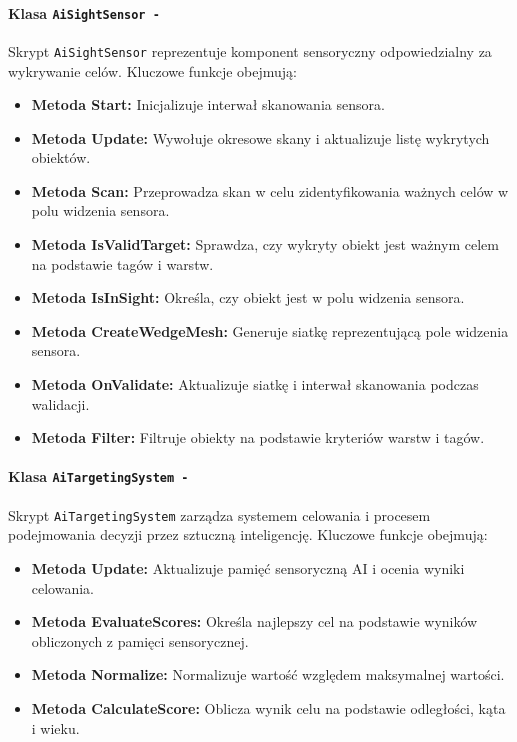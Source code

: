 \paragraph{Klasa \texttt{AiSightSensor -}}
Skrypt \texttt{AiSightSensor} reprezentuje komponent sensoryczny odpowiedzialny za wykrywanie celów. Kluczowe funkcje obejmują:
\begin{itemize}
  \item \textbf{Metoda Start:} Inicjalizuje interwał skanowania sensora.
  \item \textbf{Metoda Update:} Wywołuje okresowe skany i aktualizuje listę wykrytych obiektów.
  \item \textbf{Metoda Scan:} Przeprowadza skan w celu zidentyfikowania ważnych celów w polu widzenia sensora.
  \item \textbf{Metoda IsValidTarget:} Sprawdza, czy wykryty obiekt jest ważnym celem na podstawie tagów i warstw.
  \item \textbf{Metoda IsInSight:} Określa, czy obiekt jest w polu widzenia sensora.
  \item \textbf{Metoda CreateWedgeMesh:} Generuje siatkę reprezentującą pole widzenia sensora.
  \item \textbf{Metoda OnValidate:} Aktualizuje siatkę i interwał skanowania podczas walidacji.
  \item \textbf{Metoda Filter:} Filtruje obiekty na podstawie kryteriów warstw i tagów.
\end{itemize}

\paragraph{Klasa \texttt{AiTargetingSystem -}}
Skrypt \texttt{AiTargetingSystem} zarządza systemem celowania i procesem podejmowania decyzji przez sztuczną inteligencję. Kluczowe funkcje obejmują:
\begin{itemize}
  \item \textbf{Metoda Update:} Aktualizuje pamięć sensoryczną AI i ocenia wyniki celowania.
  \item \textbf{Metoda EvaluateScores:} Określa najlepszy cel na podstawie wyników obliczonych z pamięci sensorycznej.
  \item \textbf{Metoda Normalize:} Normalizuje wartość względem maksymalnej wartości.
  \item \textbf{Metoda CalculateScore:} Oblicza wynik celu na podstawie odległości, kąta i wieku.
\end{itemize}

